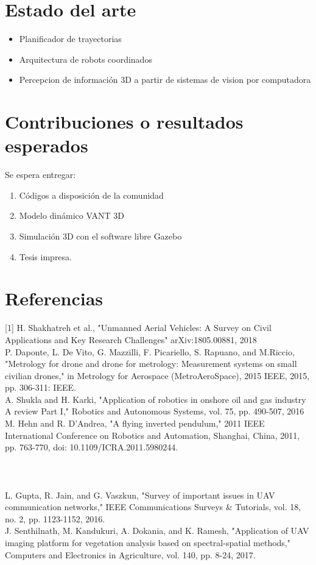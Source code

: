 \documentclass[11pt,epsf,times]{article}
\begin{document}
\section{Estado del arte}

\begin{itemize}
\item Planificador de trayectorias
\item Arquitectura de robots coordinados
\item Percepcion de información 3D a partir de sistemas de vision por computadora
\end{itemize}
\section{Contribuciones o resultados esperados}

Se espera entregar:

\begin{enumerate}
\item Códigos a disposición de la comunidad 
\item Modelo dinámico VANT 3D
\item Simulación 3D con el software libre Gazebo
\item Tesis impresa.
\end{enumerate}

\section{Referencias}
        [1] H. Shakhatreh et al., "Unmanned Aerial Vehicles: A Survey on Civil Applications and Key Research Challenges" arXiv:1805.00881, 2018\\
        [2] P. Daponte, L. De Vito, G. Mazzilli, F. Picariello, S. Rapuano, and M.Riccio, "Metrology for drone and drone for metrology: Measurement systems on small civilian drones," in Metrology for Aerospace (MetroAeroSpace), 2015 IEEE, 2015, pp. 306-311: IEEE.\\
        [3] A. Shukla and H. Karki, "Application of robotics in onshore oil and gas industry A review Part I," Robotics and Autonomous Systems, vol. 75, pp. 490-507, 2016\\
        [4] M. Hehn and R. D'Andrea, "A flying inverted pendulum," 2011 IEEE International Conference on Robotics and Automation, Shanghai, China, 2011, pp. 763-770, doi: 10.1109/ICRA.2011.5980244.\\
        [5]\\
        [6]\\
        [7] \\
        [8] L. Gupta, R. Jain, and G. Vaszkun, "Survey of important issues in UAV communication networks," IEEE Communications Surveys & Tutorials, vol. 18, no. 2, pp. 1123-1152, 2016.\\
        [9] J. Senthilnath, M. Kandukuri, A. Dokania, and K. Ramesh, "Application of UAV imaging platform for vegetation analysis based on spectral-spatial methods," Computers and Electronics in Agriculture, vol. 140, pp. 8-24, 2017.\\
        [10]\\
        
\end{document}
